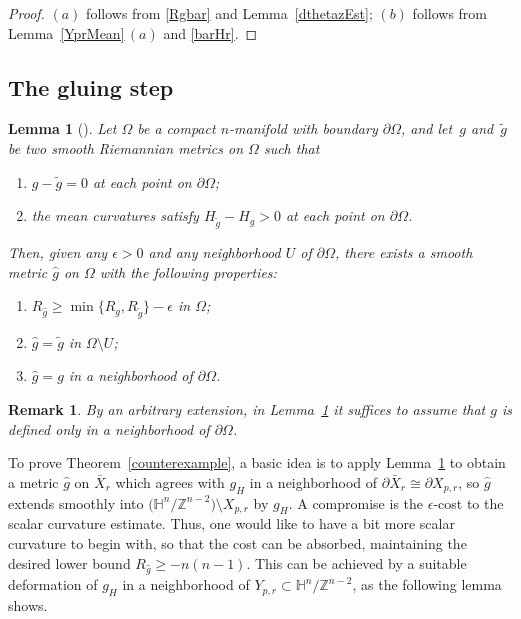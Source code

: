 \documentclass[10pt,a4paper]{amsart}
\numberwithin{equation}{section}
\newtheorem{Lemma}[Theorem]{Lemma}
\newtheorem{Remark}[Theorem]{Remark} }
\def\H{\mathbb{H}}
\def\Z{\mathbb{Z}}
\begin{document}
\begin{proof}
	 $(a)$ follows from \eqref{Rgbar} and Lemma~\ref{dthetazEst};
	 $(b)$ follows from Lemma~\ref{YprMean}\,$(a)$ and \eqref{barHr}.
\end{proof}

\subsection{The gluing step}\label{gluingSec}


\begin{Lemma}[{\cite[Theorem 5]{BMN2011}}] \label{bmnthm5}
Let $\Omega$ be a compact $n$-manifold with boundary $\partial\Omega$, and let~$g$ and~$\tilde g$ be two smooth Riemannian metrics on $\Omega$ such that
\begin{enumerate}\itemsep=0pt
\item[$(a)$] $g-\tilde  g=0$ at each point on $\partial\Omega$;
\item[$(b)$] the mean curvatures satisfy $H_{\tilde g}-H_{g}>0$ at each point on $\partial \Omega$.
\end{enumerate}
Then, given any $\epsilon>0$ and any neighborhood $U$ of $\partial \Omega$, there exists a smooth metric $ \hat g$ on $\Omega$ with the following properties:
\begin{enumerate}\itemsep=0pt
    \item[$(1)$] $R_{\hat g} \geq \min\{R_g , R_{\tilde g} \}-\epsilon $ in $\Omega$;
	\item[$(2)$] $\hat g=\tilde g$ in $\Omega\setminus U$;
	\item[$(3)$] $\hat g= g$	in a neighborhood of $\partial\Omega$.
\end{enumerate}
\end{Lemma}
\begin{Remark}
By an arbitrary extension, in Lemma~\ref{bmnthm5} it suffices to assume that $g $ is defined only in a neighborhood of $\partial \Omega$. 	
\end{Remark}

To prove Theorem~\ref{counterexample},
a basic idea is to apply Lemma~\ref{bmnthm5} to obtain a
metric $\hat g$ on $\bar X_r$ which
agrees with $g_H$ in a neighborhood of $\partial \bar X_r\cong \partial X_{p,r}$,
so $\hat g$ extends smoothly into
$\bigl(\H^{n}/\Z^{n-2}\bigr)\setminus X_{p,r}$ by $g_H$.
A compromise is the $\epsilon$-cost to the scalar curvature estimate.
Thus, one would like to have a bit more scalar curvature
to begin with, so that the cost can be absorbed, maintaining the
desired lower bound $R_{\hat g}\ge -n(n-1)$.
This can be achieved by a suitable deformation of
$g_H$ in a neighborhood of $Y_{p,r}\subset \H^{n}/\Z^{n-2}$, as the following lemma
shows.
\end{document}
